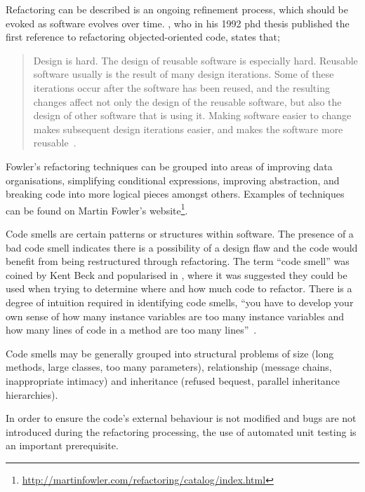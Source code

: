 Refactoring can be described is an ongoing refinement process, which should be evoked as software evolves over time. \citeauthor{opdyke92}, who in his 1992 phd thesis published the first reference to refactoring objected-oriented code, states that;

\begin{quote}
Design is hard. The design of reusable software is especially hard. Reusable software usually is
the result of many design iterations. Some of these iterations occur after the software has been
reused, and the resulting changes affect not only the design of the reusable software, but also
the design of other software that is using it. Making software easier to change makes subsequent
design iterations easier, and makes the software more reusable~\citep{opdyke92}.
\end{quote} 

Fowler's refactoring techniques can be grouped into areas of improving data organisations, simplifying conditional expressions, improving abstraction, and breaking code into more logical pieces amongst others. Examples of  techniques can be found on Martin Fowler's website\footnote{\url{http://martinfowler.com/refactoring/catalog/index.html}}.


Code smells are certain patterns or structures within software. The presence of a bad code smell indicates there is a possibility of a design flaw and the code would benefit from being restructured through refactoring. The term ``code smell'' was coined by Kent Beck and popularised in \cite{fowler99}, where it was suggested they could be used when trying to determine where and how much code to refactor. There is a degree of intuition required in identifying code smells, ``you have to develop your own sense of how many instance variables are too many instance variables and how many lines of code in a method are too many lines''~\citep[pg.~75]{fowler99}. 

Code smells may be generally grouped into structural problems of size (long methods, large classes, too many parameters), relationship (message chains, inappropriate intimacy) and inheritance (refused bequest, parallel inheritance hierarchies).

In order to ensure the code's external behaviour is not modified and bugs are not introduced during the refactoring processing, the use of automated unit testing is an important prerequisite. 


